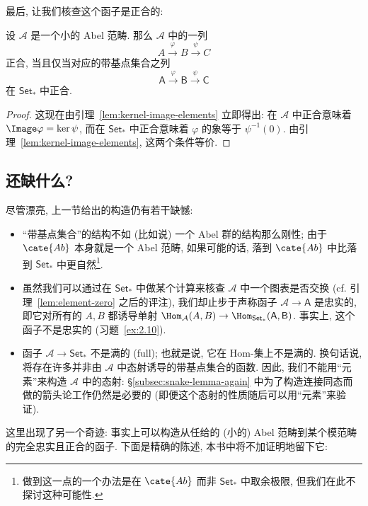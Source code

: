 \indent 最后, 让我们核查这个函子是正合的:

\begin{proposition}\label{prop:exact-elements}
设 $\mathcal{A}$ 是一个小的 Abel 范畴. 那么 $\mathcal{A}$ 中的一列
\[
A\xrightarrow{\varphi} B\xrightarrow{\psi} C
\]
正合, 当且仅当对应的带基点集合之列
\[
\mathsf{A}\xrightarrow{\varphi} \mathsf{B}\xrightarrow{\psi} \mathsf{C}
\]
在 $\mathsf{Set}_*$ 中正合.
\end{proposition}

\begin{proof}
这现在由引理~\ref{lem:kernel-image-elements} 立即得出: 在 $\mathcal{A}$ 中正合意味着 $\Image\varphi=\ker\psi$, 而在 $\mathsf{Set}_*$ 中正合意味着 $\varphi$ 的象等于 $\psi^{-1}(0)$. 由引理~\ref{lem:kernel-image-elements}, 这两个条件等价.
\end{proof}

\subsection{还缺什么?}
\label{subsec:what-is-missing}

尽管漂亮, 上一节给出的构造仍有若干缺憾:
\begin{itemize}
\item ``带基点集合''的结构不如 (比如说) 一个 Abel 群的结构那么刚性; 由于 $\cate{Ab}$ 本身就是一个 Abel 范畴, 如果可能的话, 落到 $\cate{Ab}$ 中比落到 $\mathsf{Set}_*$ 中更自然\footnote{做到这一点的一个办法是在 $\cate{Ab}$ 而非 $\mathsf{Set}_*$ 中取余极限, 但我们在此不探讨这种可能性.}.
\item 虽然我们可以通过在 $\mathsf{Set}_*$ 中做某个计算来核查 $\mathcal{A}$ 中一个图表是否交换 (cf. 引理~\ref{lem:element-zero} 之后的评注), 我们却止步于声称函子 $\mathcal{A}\to\mathsf{A}$ 是忠实的, 即它对所有的 $A,B$ 都诱导单射 $\Hom_{\mathcal{A}}(A,B)\to\Hom_{\mathsf{Set}_*}(\mathsf{A},\mathsf{B})$. 事实上, 这个函子不是忠实的 (习题~\ref{ex:2.10}).
\item 函子 $\mathcal{A}\to\mathsf{Set}_*$ 不是满的 (full); 也就是说, 它在 Hom-集上不是满的. 换句话说, 将存在许多并非由 $\mathcal{A}$ 中态射诱导的带基点集合的函数. 因此, 我们不能用``元素''来构造 $\mathcal{A}$ 中的态射: \S\ref{subsec:snake-lemma-again} 中为了构造连接同态而做的箭头论工作仍然是必要的 (即便这个态射的性质随后可以用``元素''来验证).
\end{itemize}

\indent 这里出现了另一个奇迹: 事实上可以构造从任给的 (小的) Abel 范畴到某个模范畴的完全忠实且正合的函子. 下面是精确的陈述, 本书中将不加证明地留下它:

